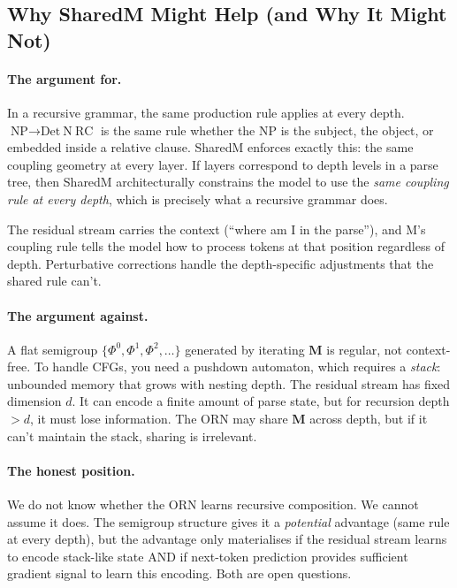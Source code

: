 \documentclass[11pt, a4paper]{article}
\newcommand{\M}{\mathbf{M}}
\theoremstyle{plain}
\theoremstyle{definition}
\theoremstyle{remark}
\begin{document}
\subsection{Why SharedM Might Help (and Why It Might Not)}

\paragraph{The argument for.}
In a recursive grammar, the same production rule applies at every depth.
$\text{NP} \to \text{Det}~\text{N}~\text{RC}$ is the same rule whether the NP is the subject, the object, or embedded inside a relative clause.
SharedM enforces exactly this: the same coupling geometry at every layer.
If layers correspond to depth levels in a parse tree, then SharedM architecturally constrains the model to use the \emph{same coupling rule at every depth}, which is precisely what a recursive grammar does.

The residual stream carries the context (``where am I in the parse''), and M's coupling rule tells the model how to process tokens at that position regardless of depth.
Perturbative corrections handle the depth-specific adjustments that the shared rule can't.

\paragraph{The argument against.}
A flat semigroup $\{\Phi^0, \Phi^1, \Phi^2, \ldots\}$ generated by iterating $\M$ is regular, not context-free.
To handle CFGs, you need a pushdown automaton, which requires a \emph{stack}: unbounded memory that grows with nesting depth.
The residual stream has fixed dimension $d$.
It can encode a finite amount of parse state, but for recursion depth $> d$, it must lose information.
The ORN may share $\M$ across depth, but if it can't maintain the stack, sharing is irrelevant.

\paragraph{The honest position.}
We do not know whether the ORN learns recursive composition.
We cannot assume it does.
The semigroup structure gives it a \emph{potential} advantage (same rule at every depth), but the advantage only materialises if the residual stream learns to encode stack-like state AND if next-token prediction provides sufficient gradient signal to learn this encoding.
Both are open questions.
\end{document}
